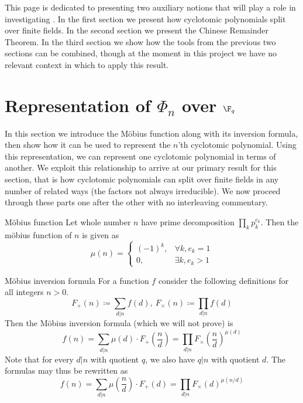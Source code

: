 
This page is dedicated to presenting two auxiliary notions that will play a role in investigating .
In the first section we present how cyclotomic polynomials split over finite fields.
In the second section we present the Chinese Remainder Theorem.
In the third section we show how the tools from the previous two sections can be combined, though at the moment in this project we have no relevant context in which to apply this result.


\section[Representation of Phi_n over F_q]{Representation of $\Phi_n$ over $\F_q$}

In this section we introduce the Möbius function along with its inversion formula, then show how it can be used to represent the $n$'th cyclotomic polynomial.
Using this representation, we can represent one cyclotomic polynomial in terms of another.
We exploit this relationship to arrive at our primary result for this section, that is how cyclotomic polynomials can split over finite fields in any number of related ways (the factors not always irreducible).
We now proceed through these parts one after the other with no interleaving commentary.

\begin{definition}{Möbius function}
    Let whole number $n$ have prime decomposition $\prod_k p_k^{e_k}$.
    Then the möbius function of $n$ is given as
    \begin{equation}
        \mu(n)=
        \begin{cases}
            (-1)^k, & \forall k, e_k=1 \\
            0, & \exists k, e_k>1
        \end{cases}
    \end{equation}
\end{definition}

\begin{lemma}{Möbius inversion formula}
    For a function $f$ consider the following definitions for all integers $n>0$.
    \begin{equation}
        F_+(n)\coloneqq\sum_{d|n} f(d),\ F_\times(n)\coloneqq\prod_{d|n} f(d)
    \end{equation}
    Then the Möbius inversion formula (which we will not prove) is
    \begin{equation}
        f(n) = \sum_{d|n} \mu(d)\cdot F_+\left(\frac{n}{d}\right)
        = \prod_{d|n} F_\times\left(\frac{n}{d}\right)^{\mu(d)}
    \end{equation}
    Note that for every $d|n$ with quotient $q$, we also have $q|n$ with quotient $d$.
    The formulas may thus be rewritten as
    \begin{equation}
        f(n) = \sum_{d|n} \mu\left(\frac{n}{d}\right)\cdot F_+(d)
        = \prod_{d|n} F_\times(d)^{\mu(n/d)}
    \end{equation}
\end{lemma}

